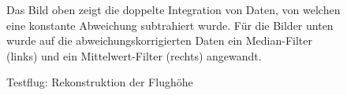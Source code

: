 \begin{figure}[ht!]
\vspace{0.25cm}
\begin{center}
\caption{Testflug: Rekonstruktion der Flughöhe}
\label{fig:FlightHeightReconst}
\end{center}

\vspace{0.25cm}
Das Bild oben zeigt die doppelte Integration von Daten, von welchen eine konstante Abweichung subtrahiert wurde. 
Für die Bilder unten wurde auf die abweichungskorrigierten Daten ein Median-Filter (links) und ein Mittelwert-Filter (rechts) angewandt.
\end{figure}











